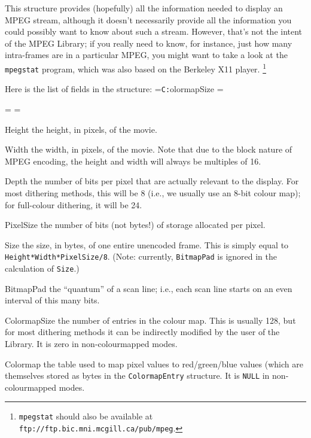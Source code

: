 \documentclass[11pt]{article}
\newcommand{\code}[1]{\texttt{#1}}
\newcommand{\ttlabel}[1]{\texttt{#1:}\quad\hfil}
\newenvironment{ttdescription}[1] {\newbox\holder
  \setbox\holder=\hbox{\ttlabel#1} \dimen0=\wd\holder
 \begin{list}{}
   {\labelsep=-0.25in \rightmargin=0.25in \leftmargin=\dimen0
     \addtolength{\leftmargin}{0.25in}
  \labelwidth=\leftmargin
  \let\makelabel\ttlabel}}%
{\end{list}}
\begin{document}
This structure provides (hopefully) all the information needed to
display an MPEG stream, although it doesn't necessarily provide all
the information you could possibly want to know about such a stream.
However, that's not the intent of the MPEG Library; if you really need
to know, for instance, just how many intra-frames are in a particular
MPEG, you might want to take a look at the \code{mpegstat} program,
which was also based on the Berkeley X11 player.%
\footnote{\code{mpegstat} should also be available at
   \code{ftp://ftp.bic.mni.mcgill.ca/pub/mpeg}.}

Here is the list of fields in the structure:
\begin{ttdescription}{ColormapSize}
\item[Height] the height, in pixels, of the movie.
\item[Width] the width, in pixels, of the movie.  Note that due to the
  block nature of MPEG encoding, the height and width will always be
  multiples of 16.
\item[Depth] the number of bits per pixel that are actually relevant
  to the display.  For most dithering methods, this will be 8 (i.e.,
  we usually use an 8-bit colour map); for full-colour dithering, it
  will be 24.
\item[PixelSize] the number of bits (not bytes!) of storage allocated
  per pixel.
\item[Size] the size, in bytes, of one entire unencoded frame.  This
  is simply equal to \code{Height*Width*PixelSize/8}.  (Note:
  currently, \code{BitmapPad} is ignored in the calculation of
  \code{Size}.)
\item[BitmapPad] the ``quantum'' of a scan line; i.e., each scan line
  starts on an even interval of this many bits.
\item[ColormapSize] the number of entries in the colour map.  This is
  usually 128, but for most dithering methods it can be indirectly
  modified by the user of the Library.  It is zero in non-colourmapped
  modes.
\item[Colormap] the table used to map pixel values to
  red/\-green/\-blue values (which are themselves stored as bytes in
  the \code{ColormapEntry} structure.  It is \code{NULL} in
  non-colourmapped modes.
\end{ttdescription}
\end{document}
